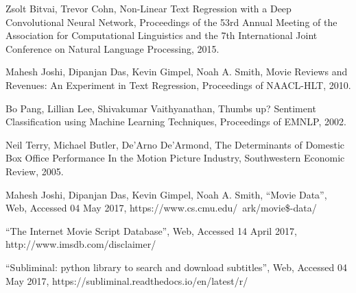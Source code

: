 \documentclass[11pt]{article}
\begin{document}
\begin{thebibliography}{9}

  Zsolt Bitvai, Trevor Cohn,
  Non-Linear Text Regression with a Deep Convolutional Neural Network,
  Proceedings of the 53rd Annual Meeting of the Association for Computational
  Linguistics and the 7th International Joint Conference on Natural Language Processing,
  2015.
    
  Mahesh Joshi, Dipanjan Das, Kevin Gimpel, Noah A. Smith,
  Movie Reviews and Revenues: An Experiment in Text Regression,
  Proceedings of NAACL-HLT,
  2010.
  
  Bo Pang, Lillian Lee, Shivakumar Vaithyanathan,
  Thumbs up? Sentiment Classification using Machine Learning Techniques,
  Proceedings of EMNLP,
  2002.
  
  Neil Terry, Michael Butler, De'Arno De'Armond,
  The Determinants of Domestic Box Office Performance In the Motion Picture Industry,
  Southwestern Economic Review,
  2005.
    
  Mahesh Joshi, Dipanjan Das, Kevin Gimpel, Noah A. Smith,
  ``Movie Data'',
  Web,
  Accessed 04 May 2017,
  https://www.cs.cmu.edu/~ark/movie\$-data/

    ``The Internet Movie Script Database'',
    Web,
    Accessed 14 April 2017,
    http://www.imsdb.com/disclaimer/
    
    ``Subliminal: python library to search and download subtitles'',
    Web,
    Accessed 04 May 2017,
    https://subliminal.readthedocs.io/en/latest/r/
  
\end{thebibliography}
\end{document}
